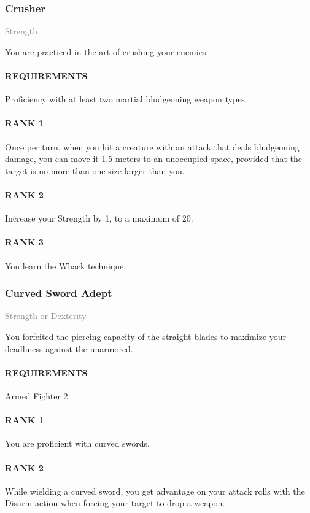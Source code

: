 \subsubsection{Crusher} \label{feat::crusher}
\small{\textcolor{gray}{Strength}}

\normalsize
You are practiced in the art of crushing your enemies.
\paragraph{REQUIREMENTS} Proficiency with at least two martial bludgeoning weapon types.
\paragraph{RANK 1} Once per turn, when you hit a creature with an attack that deals bludgeoning damage, you can move it 1.5 meters to an unoccupied space, provided that the target is no more than one size larger than you.
\paragraph{RANK 2} Increase your Strength by 1, to a maximum of 20.
\paragraph{RANK 3} You learn the Whack technique.

\subsubsection{Curved Sword Adept} \label{feat::curvedswordadept}
\small{\textcolor{gray}{Strength or Dexterity}}

\normalsize
You forfeited the piercing capacity of the straight blades to maximize your deadliness against the unarmored.
\paragraph{REQUIREMENTS} Armed Fighter 2.
\paragraph{RANK 1} You are proficient with curved swords.
\paragraph{RANK 2} While wielding a curved sword, you get advantage on your attack rolls with the Disarm action when forcing your target to drop a weapon.
